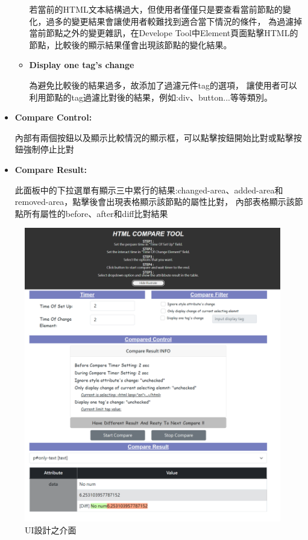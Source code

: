 \begin{itemize}
\begin{itemize}
        若當前的HTML文本結構過大，但使用者僅僅只是要查看當前節點的變化，過多的變更結果會讓使用者較難找到適合當下情況的條件，
        為過濾掉當前節點之外的變更雜訊，在Develope Tool中Element頁面點擊HTML的節點，比較後的顯示結果僅會出現該節點的變化結果。
        
        \item\textbf{Display one tag's change}
        
        為避免比較後的結果過多，故添加了過濾元件tag的選項，
        讓使用者可以利用節點的tag過濾比對後的結果，例如:div、button...等等類別。

    \end{itemize}
    
    \item\textbf{Compare Control:}
 
    內部有兩個按鈕以及顯示比較情況的顯示框，可以點擊按鈕開始比對或點擊按鈕強制停止比對
    
    \item\textbf{Compare Result:}

    此面板中的下拉選單有顯示三中累行的結果:changed-area、added-area和removed-area，點擊後會出現表格顯示該節點的屬性比對，
    內部表格顯示該節點所有屬性的before、after和diff比對結果
    
    \end{itemize}
\indent

\begin{figure}[H]
    \centering
    \includegraphics[width=1\textwidth]{picture/ch3-UIUX-example.png}
    \caption{UI設計之介面}
    \label{f3.8}
\end{figure}